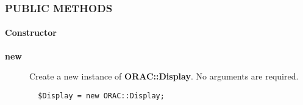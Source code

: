 \subsubsection*{PUBLIC METHODS\label{ORAC::Display_PUBLIC_METHODS}}
\paragraph*{Constructor\label{ORAC::Display_Constructor}}
\begin{description}

\item[\textbf{new}] \mbox{}

Create a new instance of \textbf{ORAC::Display}. No arguments are
required.

\begin{verbatim}
  $Display = new ORAC::Display;
\end{verbatim}
\end{description}
